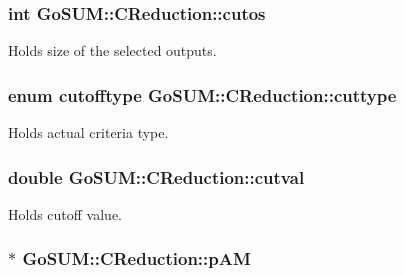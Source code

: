 \hypertarget{class_go_s_u_m_1_1_c_reduction_a5b4753c603e0e498087f9d0f217bad9d}{
\subsubsection[{cutos}]{\setlength{\rightskip}{0pt plus 5cm}int Go\-S\-U\-M\-::\-C\-Reduction\-::cutos\hspace{0.3cm}{\ttfamily [private]}}}\label{class_go_s_u_m_1_1_c_reduction_a5b4753c603e0e498087f9d0f217bad9d}
Holds size of the selected outputs. \hypertarget{class_go_s_u_m_1_1_c_reduction_a46df397401c425c8eec903742e2ec6c6}{
\subsubsection[{cuttype}]{\setlength{\rightskip}{0pt plus 5cm}enum {\bf cutofftype} Go\-S\-U\-M\-::\-C\-Reduction\-::cuttype\hspace{0.3cm}{\ttfamily [static]}}}\label{class_go_s_u_m_1_1_c_reduction_a46df397401c425c8eec903742e2ec6c6}


Holds actual criteria type. 

\hypertarget{class_go_s_u_m_1_1_c_reduction_a62e583dd897673d455630507380066df}{
\subsubsection[{cutval}]{\setlength{\rightskip}{0pt plus 5cm}double Go\-S\-U\-M\-::\-C\-Reduction\-::cutval\hspace{0.3cm}{\ttfamily [private]}}}\label{class_go_s_u_m_1_1_c_reduction_a62e583dd897673d455630507380066df}


Holds cutoff value. 

\hypertarget{class_go_s_u_m_1_1_c_reduction_a5efc18783ec4b8ca049009edbc1f5895}{
\subsubsection[{p\-A\-M}]{$\ast$ Go\-S\-U\-M\-::\-C\-Reduction\-::p\-A\-M\hspace{0.3cm}{\ttfamily [private]}}}\label{class_go_s_u_m_1_1_c_reduction_a5efc18783ec4b8ca049009edbc1f5895}


